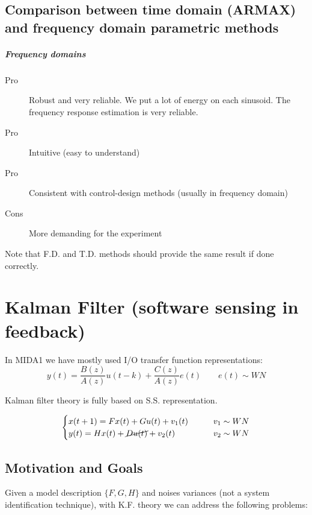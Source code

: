 \section{Comparison between time domain (ARMAX) and frequency domain parametric methods}

\paragraph{Frequency domains}
\begin{description}
    \item[Pro] Robust and very reliable. We put a lot of energy on each sinusoid. The frequency response estimation is very reliable.
    \item[Pro] Intuitive (easy to understand)
    \item[Pro] Consistent with control-design methods (usually in frequency domain)
    \item[Cons] More demanding for the experiment
\end{description}

Note that F.D. and T.D. methods should provide the same result if done correctly.


\chapter{Kalman Filter (software sensing in feedback)}

In MIDA1 we have mostly used I/O transfer function representations:
\[ y(t) = \frac{B(z)}{A(z)}u(t-k) + \frac{C(z)}{A(z)}e(t) \qquad e(t) \sim WN \]


Kalman filter theory is fully based on S.S. representation.

\[
    \begin{cases}
        x(t+1) = Fx(t) + Gu(t) + v_1(t)  & \qquad v_1 \sim WN \\
        y(t) = Hx(t) + \cancel{Du(t)} + v_2(t) & \qquad v_2 \sim WN
    \end{cases}
\]

\section{Motivation and Goals}

Given a model description $\{F, G, H\}$ and noises variances (not a system identification technique), with K.F. theory we can address the following problems:

